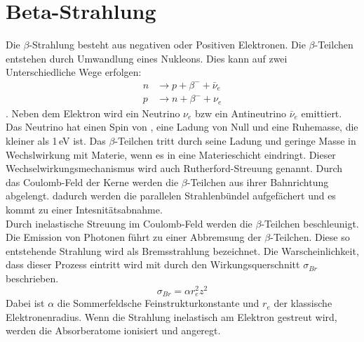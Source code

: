 \section{Beta-Strahlung}

Die $\beta$-Strahlung besteht aus negativen oder Positiven Elektronen.
Die $\beta$-Teilchen entstehen durch Umwandlung eines Nukleons.
Dies kann auf zwei Unterschiedliche Wege erfolgen:
\begin{align*}
  n &\rightarrow p +\beta^- +\bar{\nu}_e \\
  p &\rightarrow n +\beta^- +\nu_e
\end{align*}.
Neben dem Elektron wird ein Neutrino $\nu_e$ bzw ein Antineutrino $\bar{\nu}_e$ emittiert.
Das Neutrino hat einen Spin von , eine Ladung von Null und eine Ruhemasse, die kleiner als 1\,eV ist.
Das $\beta$-Teilchen tritt durch seine Ladung und geringe Masse in Wechslwirkung mit Materie,
wenn es in eine Materieschicht eindringt.
Dieser Wechselwirkungsmechanismus wird auch Rutherford-Streuung genannt.
Durch das Coulomb-Feld der Kerne werden die $\beta$-Teilchen aus ihrer Bahnrichtung abgelengt.
dadurch werden die parallelen Strahlenbündel aufgefächert und es kommt zu einer Intesnitätsabnahme.\\
Durch inelastische Streuung im Coulomb-Feld werden die $\beta$-Teilchen beschleunigt.
Die Emission von Photonen führt zu einer Abbremsung der $\beta$-Teilchen.
Diese so entstehende Strahlung wird als Bremsstrahlung bezeichnet.
Die Warscheinlichkeit, dass dieser Prozess eintritt wird mit durch den Wirkungsquerschnitt $\sigma_{Br}$  beschrieben.
\begin{equation}
  \sigma_{Br} = \alpha r_e^2 z^2
\end{equation}
Dabei ist $\alpha$ die Sommerfeldsche Feinstrukturkonstante und $r_e$ der klassische Elektronenradius.
Wenn die Strahlung inelastisch am Elektron gestreut wird, werden die Absorberatome ionisiert und angeregt.\\


